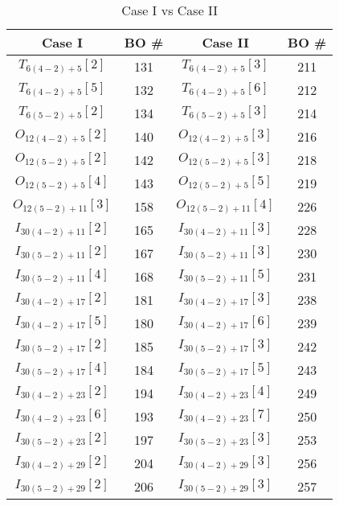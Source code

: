 \documentclass[reqno, twoside, a4paper]{amsart}
\theoremstyle{definition}
\numberwithin{equation}{section}
\begin{document}
\begin{table}
\centering

\begin{tabular}{c c c c} %
\toprule
Case I & BO \# & Case II & BO \# \\ %
\midrule
$T_{6(4-2)+5}[2]$ & 131 &   $T_{6(4-2)+5}[3]$ & 211 \\
\midrule
$T_{6(4-2)+5}[5]$ & 132 &   $T_{6(4-2)+5}[6]$ & 212 \\
\midrule
$T_{6(5-2)+5}[2]$ & 134 &   $T_{6(5-2)+5}[3]$ & 214 \\
\midrule
$O_{12(4-2)+5}[2]$ & 140 &   $O_{12(4-2)+5}[3]$ & 216 \\
\midrule
$O_{12(5-2)+5}[2]$ & 142 &   $O_{12(5-2)+5}[3]$ & 218\\
\midrule
$O_{12(5-2)+5}[4]$ & 143 &   $O_{12(5-2)+5}[5]$ & 219 \\
\midrule
$O_{12(5-2)+11}[3]$ & 158 &   $O_{12(5-2)+11}[4]$ & 226 \\
\midrule
$I_{30(4-2)+11}[2]$ & 165 &   $I_{30(4-2)+11}[3]$ & 228 \\
\midrule
$I_{30(5-2)+11}[2]$ & 167 &   $I_{30(5-2)+11}[3]$ & 230 \\
\midrule
$I_{30(5-2)+11}[4]$ & 168 &   $I_{30(5-2)+11}[5]$ & 231 \\
\midrule
$I_{30(4-2)+17}[2]$ & 181 &   $I_{30(4-2)+17}[3]$ & 238 \\
\midrule
$I_{30(4-2)+17}[5]$ & 180 &   $I_{30(4-2)+17}[6]$ & 239 \\
\midrule
$I_{30(5-2)+17}[2]$ & 185 &   $I_{30(5-2)+17}[3]$ & 242 \\
\midrule
$I_{30(5-2)+17}[4]$ & 184 &   $I_{30(5-2)+17}[5]$ & 243 \\
\midrule
$I_{30(4-2)+23}[2]$ & 194 &   $I_{30(4-2)+23}[4]$ & 249 \\
\midrule
$I_{30(4-2)+23}[6]$ & 193 &   $I_{30(4-2)+23}[7]$ & 250 \\
\midrule
$I_{30(5-2)+23}[2]$ & 197  &   $I_{30(5-2)+23}[3]$ & 253 \\
\midrule
$I_{30(4-2)+29}[2]$ & 204 &   $I_{30(4-2)+29}[3]$ & 256 \\
\midrule
$I_{30(5-2)+29}[2]$ & 206  &   $I_{30(5-2)+29}[3]$ & 257 \\
\bottomrule
\end{tabular}

\medskip

\caption{Case I vs Case II}
\label{table:CaseI-vs-CaseII}
\end{table}
\end{document}
